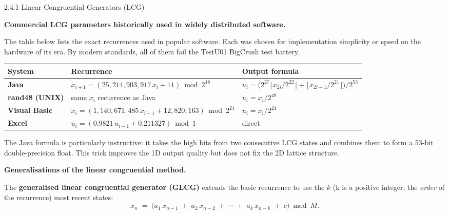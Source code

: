 \documentclass[aspectratio=169,10pt]{beamer}
\begin{document}
\begin{frame}[allowframebreaks]{2.4.1 Linear Congruential Generators (LCG)}
\framebreak

\textbf{Commercial LCG parameters historically used in widely distributed software.}

\medskip
The table below lists the exact recurrences used in popular software.  Each
was chosen for implementation simplicity or speed on the hardware of its era.
By modern standards, all of them fail the TestU01 BigCrush test battery.

\medskip
\begin{center}
\begin{tabular}{lll}
  \toprule
  System & Recurrence & Output formula \\
  \midrule
  \textbf{Java} &
    $x_{i+1} = (25{,}214{,}903{,}917\,x_i + 11) \bmod 2^{48}$ &
    $u_i = \bigl(2^{27}\lfloor x_{2i}/2^{22}\rfloor
           + \lfloor x_{2i+1}/2^{21}\rfloor\bigr)/2^{53}$ \\[3pt]
  \textbf{rand48 (UNIX)} &
    same $x_i$ recurrence as Java &
    $u_i = x_i / 2^{48}$ \\[3pt]
  \textbf{Visual Basic} &
    $x_i = (1{,}140{,}671{,}485\,x_{i-1} + 12{,}820{,}163) \bmod 2^{24}$ &
    $u_i = x_i / 2^{24}$ \\[3pt]
  \textbf{Excel} &
    $u_i = (0.9821\,u_{i-1} + 0.211327) \bmod 1$ & direct \\
  \bottomrule
\end{tabular}
\end{center}

\medskip
The Java formula is particularly instructive: it takes the high bits from two
consecutive LCG states and combines them to form a 53-bit double-precision
float.  This trick improves the 1D output quality but does not fix the
2D lattice structure.

\framebreak

\textbf{Generalisations of the linear congruential method.}

The \textbf{generalised linear congruential generator (GLCG)} extends the
basic recurrence to use the $k$ (k is a positive integer, the \emph{order}
of the recurrence) most recent states:
\[
  x_n \;=\; \bigl(a_1\,x_{n-1} \;+\; a_2\,x_{n-2} \;+\; \cdots
             \;+\; a_k\,x_{n-k} \;+\; c\bigr) \bmod M.
\]


\end{frame}
\end{document}
